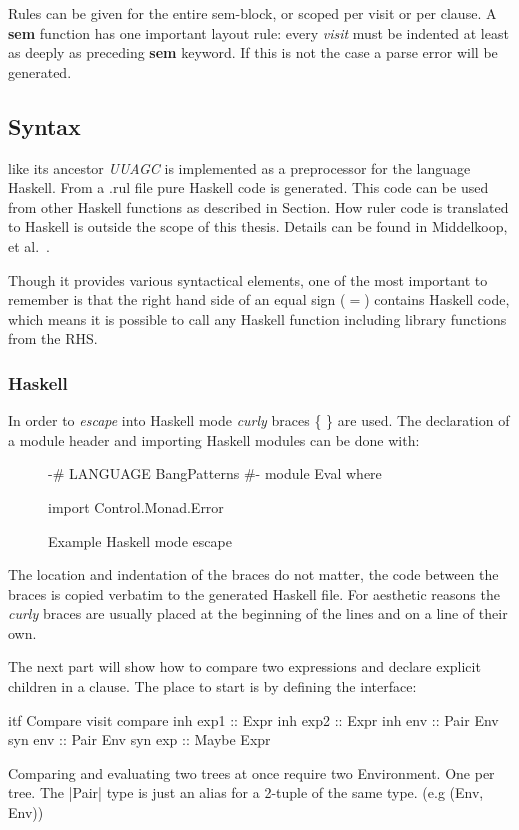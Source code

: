Rules can be given for the entire sem-block, or scoped per visit or per clause.
A \textbf{sem} function has one important layout rule: every \emph{visit} must be indented at least as deeply as preceding \textbf{sem} keyword. If this is not the case a parse error will be generated.

\subsection{Syntax}
\Rcore like its ancestor \emph{UUAGC} is implemented as a preprocessor for the language Haskell. From a .rul file pure Haskell code is generated. This code can be used from other Haskell functions as described in Section\cite{calling:sem}. How ruler code is translated to Haskell is outside the scope of this thesis. Details can be found in Middelkoop, et al.~\cite{visitag}.

Though it provides various syntactical elements, one of the most important to remember is that the right hand side of an equal sign ($=$) contains Haskell code, which means it is possible to call any Haskell function including library functions from the RHS. 

\subsubsection{Haskell}
In order to \emph{escape} into Haskell mode \emph{curly} braces \{ \} are used. The declaration of a module header and importing Haskell modules can be done with:

\begin{figure}[!h]
\begin{code}
{
{-# LANGUAGE BangPatterns #-}
module Eval where

import Control.Monad.Error
}
\end{code}
\caption{Example Haskell mode escape}
\end{figure}

The location and indentation of the braces do not matter, the code between the braces is copied verbatim to the generated Haskell file. For aesthetic reasons the \emph{curly} braces are usually placed at the beginning of the lines and on a line of their own. 

The next part will show how to compare two expressions and declare  explicit children in a clause. The place to start is by defining the interface:

\begin{code}
itf Compare
  visit compare
    inh exp1  :: Expr
    inh exp2  :: Expr
    inh env   :: Pair Env
    syn env   :: Pair Env
    syn exp   :: Maybe Expr
\end{code}
Comparing and evaluating two trees at once require two Environment. One per tree. The |Pair| type is just an alias for a 2-tuple of the same type. (e.g  (Env, Env))

